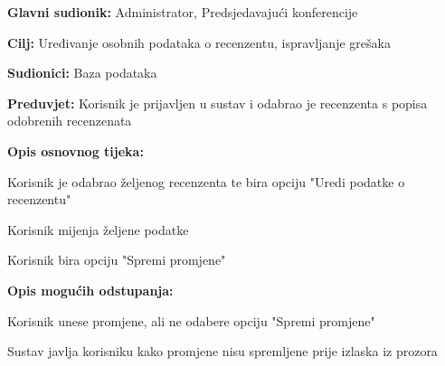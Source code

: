 					\noindent {}
					\begin{packed_item}
						\item \textbf{Glavni sudionik:} Administrator, Predsjedavajući konferencije
						\item \textbf{Cilj:} Uređivanje osobnih podataka o recenzentu, ispravljanje grešaka
						\item \textbf{Sudionici:} Baza podataka
						\item \textbf{Preduvjet:} Korisnik je prijavljen u sustav i odabrao je recenzenta s popisa odobrenih recenzenata
						
						\item \textbf{Opis osnovnog tijeka:} 
						\item[] \begin{packed_enum}
							\item Korisnik je odabrao željenog recenzenta te bira opciju "Uredi podatke o recenzentu"
							\item Korisnik mijenja željene podatke
							\item Korisnik bira opciju "Spremi promjene"
						\end{packed_enum}
						
						\item \textbf{Opis mogućih odstupanja:}
						\item[] \begin{packed_enum}
							
							\item[3.a] Korisnik unese promjene, ali ne odabere opciju "Spremi promjene"
							\item[] \begin{packed_enum}
								\item[1.] Sustav javlja korisniku kako promjene nisu spremljene prije izlaska iz prozora
							\end{packed_enum}
						\end{packed_enum}
					\end{packed_item}
					
